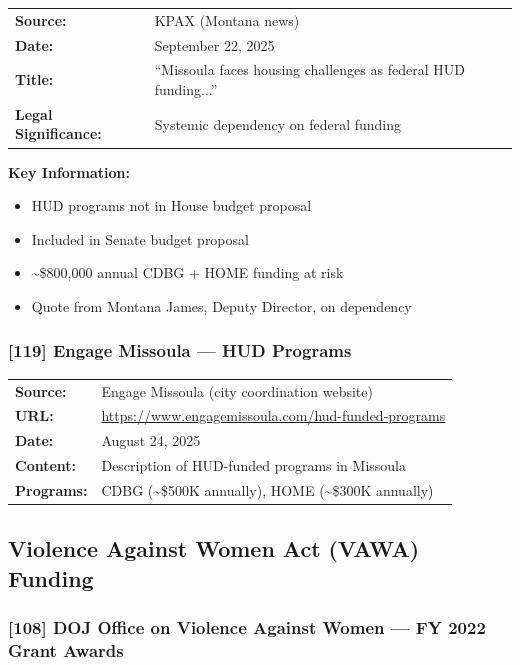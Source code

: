 \documentclass[11pt,letterpaper]{article}
\newcommand{\citeref}[1]{\textbf{\color{NavyBlue}[#1]}}
\begin{document}
\begin{tabular}{@{}p{1.4in}p{4.6in}@{}}
\textbf{Source:} & KPAX (Montana news)\\
\textbf{Date:} & September 22, 2025\\
\textbf{Title:} & ``Missoula faces housing challenges as federal HUD funding...''\\
\textbf{Legal Significance:} & Systemic dependency on federal funding\\
\end{tabular}

\vspace{0.1in}

\textbf{Key Information:}
\begin{itemize}[leftmargin=*]
\item HUD programs not in House budget proposal
\item Included in Senate budget proposal
\item \textasciitilde\$800,000 annual CDBG + HOME funding at risk
\item Quote from Montana James, Deputy Director, on dependency
\end{itemize}

\subsubsection{\citeref{119} Engage Missoula --- HUD Programs}

\begin{tabular}{@{}p{1.4in}p{4.6in}@{}}
\textbf{Source:} & Engage Missoula (city coordination website)\\
\textbf{URL:} & \url{https://www.engagemissoula.com/hud-funded-programs}\\
\textbf{Date:} & August 24, 2025\\
\textbf{Content:} & Description of HUD-funded programs in Missoula\\
\textbf{Programs:} & CDBG (\textasciitilde\$500K annually), HOME (\textasciitilde\$300K annually)\\
\end{tabular}

\subsection{Violence Against Women Act (VAWA) Funding}

\subsubsection{\citeref{108} DOJ Office on Violence Against Women --- FY 2022 Grant Awards}
\end{document}
